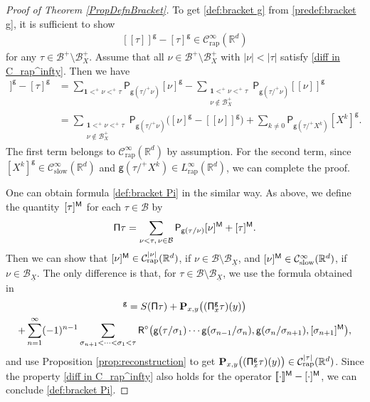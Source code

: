 \documentclass[11pt]{article}
\numberwithin{equation}{section}
\theoremstyle{plain}
\theoremstyle{definition}
\newcommand{\unit}{\mathbf{1}}
\newcommand{\Brac}[1]{[\![#1]\!]}
\newcommand{\rap}{\mathrm{rap}}
\newcommand{\slow}{\mathrm{slow}}
\newcommand{\bfP}{\mathbf{P}}
\newcommand{\sfP}{\mathsf{P}}
\newcommand{\sfR}{\mathsf{R}}
\newcommand{\sfg}{\mathsf{g}}
\newcommand{\bbR}{\mathbb{R}}
\newcommand{\mcB}{\mathcal{B}}
\newcommand{\mcC}{\mathcal{C}}
\begin{document}
\begin{proof}[Proof of Theorem \ref{PropDefnBracket}]
To get \eqref{def:bracket g} from \eqref{predef:bracket g}, it is sufficient to show
\begin{align}\label{diff in C_rap^infty}
\Brac{\tau}^\sfg-[\tau]^\sfg\in \mcC_\rap^\infty(\bbR^d)
\end{align}
for any $\tau\in\mcB^+\setminus\mcB_X^+$. Assume that all $\nu\in\mcB^+\setminus\mcB_X^+$ with $|\nu|<|\tau|$ satisfy \eqref{diff in C_rap^infty}. Then we have
\begin{align*}
\Brac{\tau}^\sfg-[\tau]^\sfg &= \sum_{\unit<^+\nu<^+\tau}\sfP_{\sfg(\tau/^+\nu)}[\nu]^\sfg-\sum_{\substack{\unit<^+\nu<^+\tau\\\nu\notin\mcB_X^+}}\sfP_{\sfg(\tau/^+\nu)}\Brac{\nu}^\sfg \\
&= \sum_{\substack{\unit<^+\nu<^+\tau\\\nu\notin\mcB_X^+}}\sfP_{\sfg(\tau/^+\nu)}\bigl([\nu]^\sfg-\Brac{\nu}^\sfg\bigr) + \sum_{k\neq0}\sfP_{\sfg(\tau/^+X^k)}[X^k]^\sfg.
\end{align*}
The first term belongs to $\mcC_\rap^\infty(\bbR^d)$ by assumption. For the second term, since $[X^k]^\sfg\in \mcC_\slow^\infty(\bbR^d)$ and $\sfg(\tau/^+X^k)\in L_\rap^\infty(\bbR^d)$, we can complete the proof.

One can obtain formula \eqref{def:bracket Pi} in the similar way. As above, we define the quantity~$[\tau]^{\sf M}$ for each $\tau\in\mcB$ by
\begin{align*}
{\sf\Pi}\tau=\sum_{\nu<\tau,\, \nu\in\mcB}\sfP_{\sfg(\tau/\nu)}[\nu]^{\sf M}+[\tau]^{\sf M}.
\end{align*}
Then we can show that $[\nu]^{\sf M}\in \mcC_\rap^{|\nu|}(\bbR^d)$, if $\nu\in\mcB\setminus\mcB_{\underline{X}}$, and $[\nu]^{\sf M}\in \mcC_\slow^\infty(\bbR^d)$, if $\nu\in\mcB_{\underline{X}}$.
The only difference is that, for $\tau\in\mcB\setminus\mcB_{\underline{X}}$, we use the formula obtained in~\cite{BH}
\begin{multline*}
[\tau]^\sfg = \textsc{S}({\sf\Pi}\tau)+\bfP_{x,y}\bigl(({\sf\Pi}_x^{\sfg}\tau)(y)\bigr) \\
+ \sum_{n=1}^\infty(-1)^{n-1}\sum_{\sigma_{n+1}<\cdots<\sigma_1<\tau} {\sfR}^\circ\bigl(\sfg(\tau/\sigma_1)\cdots\sfg(\sigma_{n-1}/\sigma_n),\sfg(\sigma_n/\sigma_{n+1}),[\sigma_{n+1}]^{\sf M}\bigr),
\end{multline*}
and use Proposition \ref{prop:reconstruction} to get $\bfP_{x,y}\bigl(({\sf\Pi}_x^{\sf g}\tau)(y)\bigr)\in \mcC_\rap^{|\tau|}(\bbR^d)$.
Since the property \eqref{diff in C_rap^infty} also holds for the operator $\Brac{\cdot}^{\sf M}-[\cdot]^{\sf M}$, we can conclude \eqref{def:bracket Pi}.
\end{proof}
\end{document}
